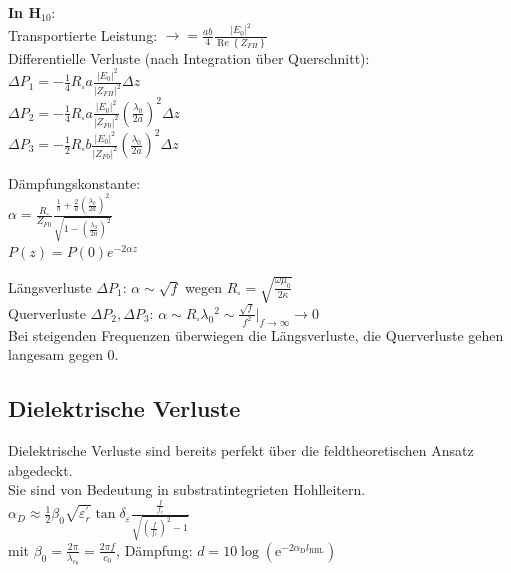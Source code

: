 \documentclass[english]{latex4ei/latex4ei_sheet}
\begin{document}
\begin{sectionbox}
    \textbf{In H$_{10}$}:\\
    Transportierte Leistung: $\rightarrow = \frac{a b}{4} \frac{\left|E_{0}\right|^{2}}{\operatorname{Re}\left\{Z_{F H}\right\}}$\\
    Differentielle Verluste (nach Integration über Querschnitt):\\
    $\Delta P_{1}=-\frac{1}{4} R_{\square} a \frac{\left|E_{0}\right|^{2}}{\left|Z_{F H}\right|^{2}} \Delta z$\\
    $\Delta P_{2}=-\frac{1}{4} R_{\square} a \frac{\left|E_{0}\right|^{2}}{\left|Z_{F 0}\right|^{2}}\left(\frac{\lambda_{0}}{2 a}\right)^{2} \Delta z$ \\
    $\Delta P_{3}=-\frac{1}{2} R_{\square} b \frac{\left|E_{0}\right|^{2}}{\left|Z_{F 0}\right|^{2}}\left(\frac{\lambda_{0}}{2 a}\right)^{2} \Delta z$\\
    \begin{emphbox}
        Dämpfungskonstante:\\
        $\alpha=\frac{R_{\square}}{Z_{F 0}} \frac{\frac{1}{b}+\frac{2}{a}\left(\frac{\lambda_{0}}{2 a}\right)^{2}}{\sqrt{1-\left(\frac{\lambda_{0}}{2 a}\right)^{2}}}$\\
        $P(z) = P(0) e^{-2\alpha z}$
    \end{emphbox}

    Längsverluste $\Delta P_{1}$: $\alpha \sim \sqrt{f}$ wegen $R_{\square}=\sqrt{\frac{\omega \mu_{0}}{2 \kappa}}$\\
    Querverluste $\Delta P_{2}, \Delta P_{3}$: $\alpha \sim R_{\square} \lambda_{0}{ }^{2} \sim \frac{\sqrt{f}}{f^{2}}|_{f \rightarrow \infty} \rightarrow 0$\\
    Bei steigenden Frequenzen überwiegen die Längsverluste, die Querverluste gehen langesam gegen 0.

\end{sectionbox}

\begin{sectionbox}
    \subsection{Dielektrische Verluste}
    Dielektrische Verluste sind bereits perfekt über die feldtheoretischen Ansatz abgedeckt.\\
    Sie sind von Bedeutung in substratintegrieten Hohlleitern.\\
    $\alpha_{D} \approx \frac{1}{2} \beta_{0} \sqrt{\varepsilon_{r}^{\prime}} \tan \delta_{\varepsilon} \frac{\frac{f}{f_{c}}}{\sqrt{\left(\frac{f}{f_{c}}\right)^{2}-1}}$\\
    mit $\beta_0 = \frac{2 \pi}{\lambda_{c_0}} = \frac{2 \pi f}{c_0}$,
    Dämpfung: $d=10 \log \left(\mathrm{e}^{-2 \alpha_{\mathrm{D}} l_{\mathrm{RHL}}}\right)$\\
\end{sectionbox}
\end{document}
